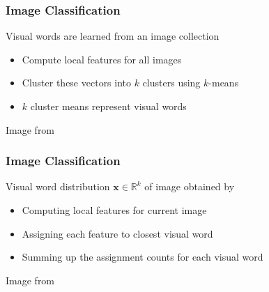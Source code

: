 \documentclass[xetex,professionalfont]{beamer}
\newcommand{\RR}{\mathbb{R}}
\renewcommand{\vec}[1]{\ensuremath{\mathbf{#1}}}
\newcommand{\vx}{\vec{x}}
\begin{document}

\begin{frame}
\frametitle{Image Classification}

Visual words are learned from an image collection
\begin{itemize}
    \item Compute local features for all images
    \item Cluster these vectors into $k$ clusters using $k$-means %
    \item $k$ cluster means represent visual words
\end{itemize}

\begin{center}
    {\centering Image from \cite{grauman2011}}
\end{center}

\end{frame}


\begin{frame}
\frametitle{Image Classification}

Visual word distribution $\vx\in\RR^k$ of image obtained by
\begin{itemize}
    \item Computing local features for current image
    \item Assigning each feature to closest visual word %
    \item Summing up the assignment counts for each visual word %
\end{itemize}

\begin{center}
    {\centering Image from \cite{grauman2011}}
\end{center}

\end{frame}
\end{document}
